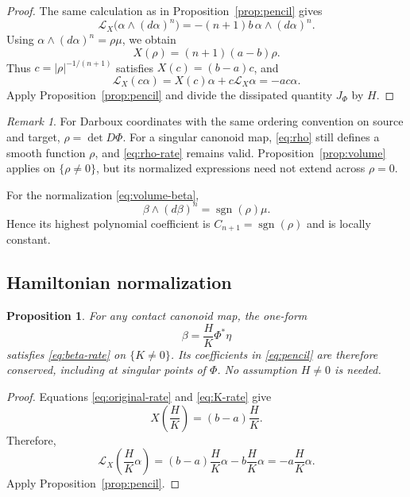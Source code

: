 \documentclass[11pt,a4paper]{article}
\numberwithin{equation}{section}
\newtheorem{proposition}{Proposition}
\theoremstyle{definition}
\theoremstyle{remark}
\newtheorem{remark}{Remark}
\begin{document}
\begin{proof}
The same calculation as in Proposition~\ref{prop:pencil}
gives
\[
\mathcal L_X\bigl(\alpha\wedge(d\alpha)^n\bigr)
=-(n+1)b\,\alpha\wedge(d\alpha)^n.
\]
Using $\alpha\wedge(d\alpha)^n=\rho\mu$, we obtain
\begin{equation}
X(\rho)=(n+1)(a-b)\rho.
\label{eq:rho-rate}
\end{equation}
Thus $c=|\rho|^{-1/(n+1)}$ satisfies $X(c)=(b-a)c$,
and
\[
\mathcal L_X(c\alpha)
=X(c)\alpha+c\mathcal L_X\alpha=-ac\alpha.
\]
Apply Proposition~\ref{prop:pencil} and divide the
dissipated quantity $J_\Phi$ by $H$.
\end{proof}

\begin{remark}
For Darboux coordinates with the same ordering convention
on source and target, $\rho=\det D\Phi$.
For a singular canonoid map, \eqref{eq:rho} still defines
a smooth function $\rho$, and \eqref{eq:rho-rate} remains
valid. Proposition~\ref{prop:volume} applies on
$\{\rho\neq0\}$, but its normalized expressions need not
extend across $\rho=0$.

For the normalization \eqref{eq:volume-beta},
\[
\beta\wedge(d\beta)^n
=\operatorname{sgn}(\rho)\mu.
\]
Hence its highest polynomial coefficient is
$C_{n+1}=\operatorname{sgn}(\rho)$ and is locally constant.
\end{remark}



\subsection{Hamiltonian normalization}

\begin{proposition}
\label{prop:ham-normalization}
For any contact canonoid map, the one-form
\begin{equation}
\beta=\frac HK\Phi^*\eta
\label{eq:ham-beta}
\end{equation}
satisfies \eqref{eq:beta-rate} on $\{K\neq0\}$.
Its coefficients in \eqref{eq:pencil} are therefore
conserved, including at singular points of $\Phi$.
No assumption $H\neq0$ is needed.
\end{proposition}

\begin{proof}
Equations \eqref{eq:original-rate} and \eqref{eq:K-rate}
give
\[
X\left(\frac HK\right)=(b-a)\frac HK.
\]
Therefore,
\[
\mathcal L_X\left(\frac HK\alpha\right)
=(b-a)\frac HK\alpha-b\frac HK\alpha
=-a\frac HK\alpha.
\]
Apply Proposition~\ref{prop:pencil}.
\end{proof}
\end{document}
